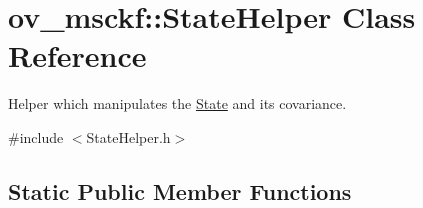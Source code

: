 \hypertarget{classov__msckf_1_1StateHelper}{}\section{ov\+\_\+msckf\+:\+:State\+Helper Class Reference}
\label{classov__msckf_1_1StateHelper}


Helper which manipulates the \hyperlink{classov__msckf_1_1State}{State} and its covariance.  




{\ttfamily \#include $<$State\+Helper.\+h$>$}

\subsection*{Static Public Member Functions}
